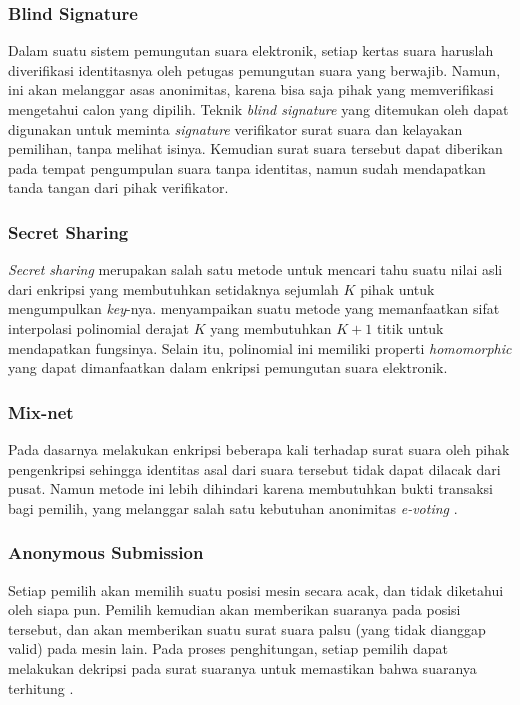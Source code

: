 \documentclass[12pt, a4paper, final]{article}
\begin{document}
\subsubsection{Blind Signature}

Dalam suatu sistem pemungutan suara elektronik, setiap kertas suara haruslah diverifikasi identitasnya oleh petugas pemungutan suara yang berwajib. Namun, ini akan melanggar asas anonimitas, karena bisa saja pihak yang memverifikasi mengetahui calon yang dipilih. Teknik \textit{blind signature} yang ditemukan oleh \cite{mixnet} dapat digunakan untuk meminta \textit{signature} verifikator surat suara dan kelayakan pemilihan, tanpa melihat isinya. Kemudian surat suara tersebut dapat diberikan pada tempat pengumpulan suara tanpa identitas, namun sudah mendapatkan tanda tangan dari pihak verifikator.

\subsubsection{Secret Sharing}

\textit{Secret sharing} merupakan salah satu metode untuk mencari tahu suatu nilai asli dari enkripsi yang membutuhkan setidaknya sejumlah $K$ pihak untuk mengumpulkan \textit{key}-nya. \cite{secretsharing3} menyampaikan suatu metode yang memanfaatkan sifat interpolasi polinomial derajat $K$ yang membutuhkan $K+1$ titik untuk mendapatkan fungsinya. Selain itu, polinomial ini memiliki properti \textit{homomorphic} yang dapat dimanfaatkan dalam enkripsi pemungutan suara elektronik.

\subsubsection{Mix-net}

Pada dasarnya melakukan enkripsi beberapa kali terhadap surat suara oleh pihak pengenkripsi sehingga identitas asal dari suara tersebut tidak dapat dilacak dari pusat. Namun metode ini lebih dihindari karena membutuhkan bukti transaksi bagi pemilih, yang melanggar salah satu kebutuhan anonimitas \textit{e-voting} \citep{mixnet}.

\subsubsection{Anonymous Submission}

Setiap pemilih akan memilih suatu posisi mesin secara acak, dan tidak diketahui oleh siapa pun. Pemilih kemudian akan memberikan suaranya pada posisi tersebut, dan akan memberikan suatu surat suara palsu (yang tidak dianggap valid) pada mesin lain. Pada proses penghitungan, setiap pemilih dapat melakukan dekripsi pada surat suaranya untuk memastikan bahwa suaranya terhitung \citep{anonsus}.
\end{document}
